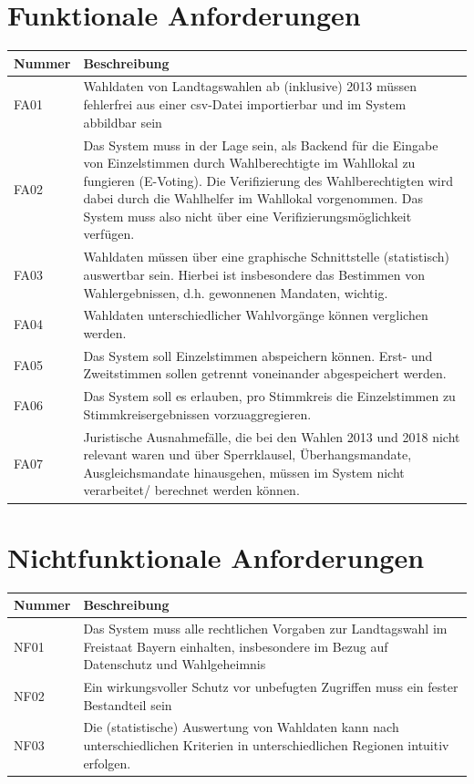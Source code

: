 \documentclass[a4paper,12pt]{article}
\newcommand\addrow[2]{#1 &#2\\ }
\newcommand\addheading[2]{#1 &#2\\ \hline}
\newcommand\tabularhead{\begin{tabular}{lp{13cm}}
\hline
}
\newenvironment{usecase}{\tabularhead}
{\hline\end{tabular}}
\begin{document}
\section{Funktionale Anforderungen}
\begin{usecase}
  \addheading{Nummer}{Beschreibung} 
  \addrow{FA01}{Wahldaten von Landtagswahlen ab (inklusive) 2013 müssen fehlerfrei aus einer csv-Datei importierbar und im System abbildbar sein}
  \addrow{FA02}{Das System muss in der Lage sein, als Backend für die Eingabe von Einzelstimmen durch Wahlberechtigte im Wahllokal zu fungieren (E-Voting). Die Verifizierung des Wahlberechtigten wird dabei durch die Wahlhelfer im Wahllokal vorgenommen. Das System muss also nicht über eine Verifizierungsmöglichkeit verfügen.}
  \addrow{FA03}{Wahldaten müssen über eine graphische Schnittstelle (statistisch) auswertbar sein. Hierbei ist insbesondere das Bestimmen von
                Wahlergebnissen, d.h. gewonnenen Mandaten, wichtig.}
  \addrow{FA04}{Wahldaten unterschiedlicher Wahlvorgänge können verglichen werden.}
  \addrow{FA05}{Das System soll Einzelstimmen abspeichern können. Erst- und Zweitstimmen sollen getrennt voneinander abgespeichert werden.}
  \addrow{FA06}{Das System soll es erlauben, pro Stimmkreis die Einzelstimmen zu Stimmkreisergebnissen vorzuaggregieren.}
  \addrow{FA07}{Juristische Ausnahmefälle, die bei den Wahlen 2013 und 2018 nicht relevant waren und über Sperrklausel, Überhangsmandate, Ausgleichsmandate hinausgehen, müssen im System nicht verarbeitet/ berechnet werden können.}
  
\end{usecase}

\section{Nichtfunktionale Anforderungen}
\begin{usecase}
  \addheading{Nummer}{Beschreibung} 
  \addrow{NF01}{Das System muss alle rechtlichen Vorgaben zur Landtagswahl im Freistaat Bayern einhalten, insbesondere im Bezug auf Datenschutz und Wahlgeheimnis}
  \addrow{NF02}{Ein wirkungsvoller Schutz vor unbefugten Zugriffen muss ein fester Bestandteil sein}
  \addrow{NF03}{Die (statistische) Auswertung von Wahldaten kann nach unterschiedlichen Kriterien in unterschiedlichen Regionen intuitiv erfolgen.}
\end{usecase}
\end{document}
